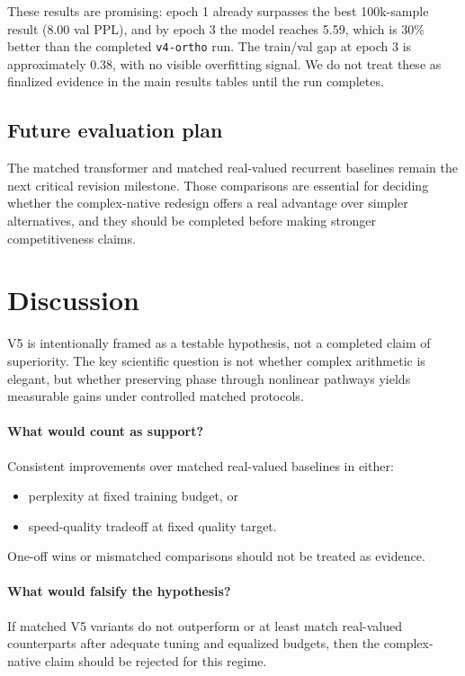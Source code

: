 \documentclass[11pt]{article}
\begin{document}
These results are promising: epoch 1 already surpasses the best 100k-sample result (8.00 val PPL), and by epoch 3 the model reaches 5.59, which is 30\% better than the completed \texttt{v4-ortho} run. The train/val gap at epoch 3 is approximately 0.38, with no visible overfitting signal. We do not treat these as finalized evidence in the main results tables until the run completes.

\subsection{Future evaluation plan}
The matched transformer and matched real-valued recurrent baselines remain the next critical revision milestone. Those comparisons are essential for deciding whether the complex-native redesign offers a real advantage over simpler alternatives, and they should be completed before making stronger competitiveness claims.

\section{Discussion}
V5 is intentionally framed as a testable hypothesis, not a completed claim of superiority.
The key scientific question is not whether complex arithmetic is elegant, but whether preserving phase through nonlinear pathways yields measurable gains under controlled matched protocols.

\paragraph{What would count as support?}
Consistent improvements over matched real-valued baselines in either:
\begin{itemize}[leftmargin=1.2em]
  \item perplexity at fixed training budget, or
  \item speed-quality tradeoff at fixed quality target.
\end{itemize}
One-off wins or mismatched comparisons should not be treated as evidence.

\paragraph{What would falsify the hypothesis?}
If matched V5 variants do not outperform or at least match real-valued counterparts after adequate tuning and equalized budgets, then the complex-native claim should be rejected for this regime.
\end{document}
